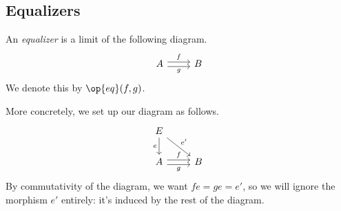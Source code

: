 \subsection{Equalizers}
\begin{defi}[Equalizer]
	An \textit{equalizer} is a limit of the following diagram.
	\[\begin{tikzcd}
		A & B
		\arrow["g"', shift right=1, from=1-1, to=1-2]
		\arrow["f", shift left=1, from=1-1, to=1-2]
	\end{tikzcd}\]
	We denote this by $\op{eq}(f,g)$.
\end{defi}
More concretely, we set up our diagram as follows.
\[\begin{tikzcd}
	E \\
	A & B
	\arrow["g"', shift right=1, from=2-1, to=2-2]
	\arrow["f", shift left=1, from=2-1, to=2-2]
	\arrow["e"', from=1-1, to=2-1]
	\arrow["{e'}", from=1-1, to=2-2]
\end{tikzcd}\]
By commutativity of the diagram, we want $fe=ge=e'$, so we will ignore the morphism $e'$ entirely: it's induced by the rest of the diagram.

